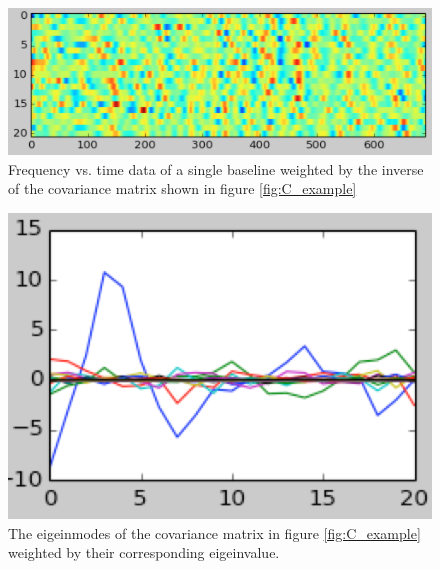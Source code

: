 \documentclass[twocolumn,numberedappendix]{emulateapj}
\begin{document}
{\begin{figure}[h!]\centering
\includegraphics[width=\columnwidth, height=.8\columnwidth]{plots/_Cx_example.png}
\caption{Frequency vs. time data of a single baseline weighted by the inverse of
the covariance matrix shown in figure \ref{fig:C_example}} 
\label{fig:_Cx_example}
\end{figure}

\begin{figure}[h!]\centering
\includegraphics[width=\columnwidth, height=.8\columnwidth]{plots/lamV_example.png}
\caption{The eigeinmodes of the covariance matrix in figure \ref{fig:C_example}
weighted by their corresponding eigeinvalue.} 
\label{fig:lamV_example}
\end{figure}

}
\end{document}
